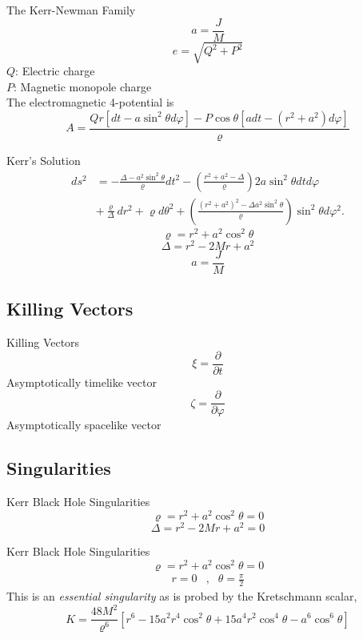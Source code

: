 \documentclass{beamer}
\begin{document}
        \begin{frame}{The Kerr-Newman Family}
            $$a=\frac{J}{M}$$
			$$e=\sqrt{Q^{2}+P^{2}}$$
			$Q$: Electric charge\\
            $P$: Magnetic monopole charge\\
            The electromagnetic 4-potential is
			$$A=\frac{Qr\left[dt-a\sin^{2}\theta d\varphi\right]-P\cos\theta\left[adt-\left(r^{2}+a^{2}\right)d\varphi\right]}{\varrho}$$
        \end{frame}
        
        \begin{frame}{Kerr's Solution}
            \begin{align*}
            ds^{2} &= -\frac{\Delta-a^{2}\sin^{2}\theta}{\varrho}dt^{2}-\left(\frac{r^{2}+a^{2}-\Delta}{\varrho}\right)2a\sin^{2}\theta dtd\varphi\nonumber \\
             & +\frac{\varrho}{\Delta}dr^{2}+\varrho d\theta^{2}+\left(\frac{\left(r^{2}+a^{2}\right)^{2}-\Delta a^{2}\sin^{2}\theta}{\varrho}\right)\sin^{2}\theta d\varphi^{2}.
            \end{align*}
            $$\varrho  = r^{2}+a^{2}\cos^{2}\theta$$
            $$\Delta =  r^{2}-2Mr+a^{2}$$
            $$a=\frac{J}{M}$$
    	\end{frame}

	\subsection{Killing Vectors}
        \begin{frame}{Killing Vectors}
        	\pause
            $$\xi  =  \frac{\partial}{\partial t}$$
			Asymptotically timelike vector
            \pause
			$$\zeta=\frac{\partial}{\partial\varphi}$$
			Asymptotically spacelike vector
    	\end{frame}

	\subsection{Singularities}
        \begin{frame}{Kerr Black Hole Singularities}
            $$\varrho  = r^{2}+a^{2}\cos^{2}\theta = 0$$
            $$\Delta =  r^{2}-2Mr+a^{2} = 0$$
    	\end{frame}
        
        \begin{frame}{Kerr Black Hole Singularities}
            $$\varrho  = r^{2}+a^{2}\cos^{2}\theta = 0$$
            \pause
            \begin{eqnarray*}
            r=0 & , & \theta=\frac{\pi}{2}
            \end{eqnarray*}
            \pause
            This is an \textit{essential singularity} as is probed by the Kretschmann scalar,
            \pause
            $$ K = \frac{48M^2}{\varrho^6} \left[ r^6 - 15a^2 r^4 \cos^2\theta + 15a^4 r^2 \cos^4\theta - a^6 \cos^6 \theta \right] $$
    	\end{frame}
        
\end{document}
